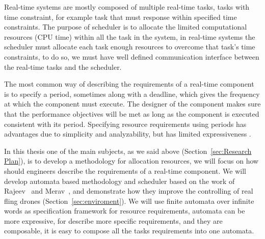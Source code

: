 \documentclass[11pt]{article}
\begin{document}
Real-time systems are mostly composed of multiple real-time tasks, tasks with time constraint, for example task that must response within specified time constraints. 
The purpose of scheduler is to allocate the limited computational resources (CPU time) within all the task in the system, in real-time systems the scheduler must allocate each task enough resources to overcome that task's time constraints, to do so, we must have well defined communication interface between the real-time tasks and the scheduler.

The most common way of describing the requirements of a real-time component is to specify a period, sometimes along with a deadline, which gives the frequency at which the component must execute. The designer of the component makes sure that the performance objectives will be met as long as the component is executed consistent with its period. %
Specifying resource requirements using periods has advantages due to simplicity and analyzability, but has limited expressiveness \cite{RTComposer}. 

In this thesis one of the main subjects, as we said above (Section~\ref{sec:Research Plan}), is to develop a methodology for allocation resources, we will focus on how should engineers describe the requirements of a real-time component.
We will develop automata based methodology and scheduler based on the work of Rajeev~\cite{RTComposer} and Merav~\cite{Merav}, and demonstrate how they improve the controlling of real fling drones (Section~\ref{sec:enviroment}).
We will use finite automata over infinite words as specification framework for resource requirements, automata can be more expressive, for describe more specific requirements, and they are composable, it is easy to compose all the tasks requirements into one automata. 
\end{document}
